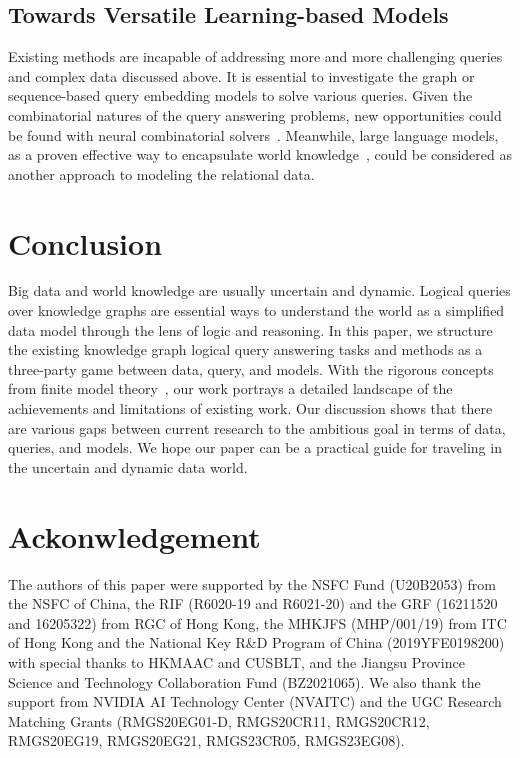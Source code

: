 \documentclass[11pt]{article}
\begin{document}
\subsection{Towards Versatile Learning-based Models}
Existing methods are incapable of addressing more and more challenging queries and complex data discussed above. It is essential to investigate the graph or sequence-based query embedding models to solve various queries. Given the combinatorial natures of the query answering problems, new opportunities could be found with neural combinatorial solvers~\cite{DBLP:conf/iclr/BelloPL0B17}. Meanwhile, large language models, as a proven effective way to encapsulate world knowledge~\cite{petroni2019language,brown2020language}, could be considered as another approach to modeling the relational data.

\section{Conclusion}
Big data and world knowledge are usually uncertain and dynamic. Logical queries over knowledge graphs are essential ways to understand the world as a simplified data model through the lens of logic and reasoning.
In this paper, we structure the existing knowledge graph logical query answering tasks and methods as a three-party game between data, query, and models. With the rigorous concepts from finite model theory~\cite{Marker2002Modeltheory,Libkin2004ElementsFinite}, our work portrays a detailed landscape of the achievements and limitations of existing work. Our discussion shows that there are various gaps between current research to the ambitious goal in terms of data, queries, and models. We hope our paper can be a practical guide for traveling in the uncertain and dynamic data world.

\section{Ackonwledgement}
The authors of this paper were supported by the NSFC Fund (U20B2053) from the NSFC of China, the RIF (R6020-19 and R6021-20) and the GRF (16211520 and 16205322) from RGC of Hong Kong, the MHKJFS (MHP/001/19) from ITC of Hong Kong and the National Key R\&D Program of China (2019YFE0198200) with special thanks to HKMAAC and CUSBLT, and the Jiangsu Province Science and Technology Collaboration Fund (BZ2021065). We also thank the support from NVIDIA AI Technology Center (NVAITC) and the UGC Research Matching Grants (RMGS20EG01-D, RMGS20CR11, RMGS20CR12, RMGS20EG19, RMGS20EG21, RMGS23CR05, RMGS23EG08).
\end{document}
